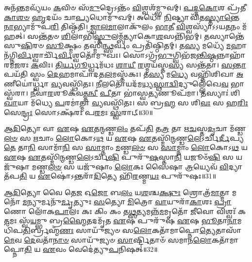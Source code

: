 𑌅𑌨᳴\-\ul{𑌨𑍍𑌤}\-𑌮𑌵𑍍𑌯᳴𑌯𑌂 \ul{𑌕}\-𑌵𑌿𑍞 𑌸᳴\-\ul{𑌮𑍁}\-𑌦𑍍𑌰𑍇𑌽𑌨𑍍𑌤𑌂᳴ \ul{𑌵𑌿}\-𑌶𑍍𑌵𑌶᳴𑌮𑍍𑌭𑍁𑌵𑌮𑍍। 
\-\ul{𑌪}\-\-\ul{𑌦𑍍𑌮}\-\-\ul{𑌕𑍋}\-𑌶 𑌪𑍍𑌰᳴𑌤𑍀\-\ul{𑌕𑌾}\-\-\ul{𑌶}\-\-\ul{𑍞} \ul{𑌹𑍃}\-𑌦𑌯𑌂᳴ 𑌚𑌾\-\ul{𑌪𑍍𑌯}\-𑌧𑍋𑌮𑍁᳴𑌖𑌮𑍍। 
𑌅𑌧𑍋᳴ \ul{𑌨𑌿}\-𑌷𑍍𑌟𑍍𑌯𑌾 𑌵𑌿᳴𑌤\-\ul{𑌸𑍍𑌤𑍍𑌯𑌾}\-\-\ul{𑌨𑍍𑌤𑍇} \ul{𑌨𑌾}\-𑌭𑍍𑌯𑌾𑌮𑍁᳴𑌪\-\ul{𑌰𑌿} 𑌤𑌿𑌷𑍍𑌠᳴𑌤𑌿। 
\-\ul{𑌜𑍍𑌵𑌾}\-\-\ul{𑌲}\-\-\ul{𑌮𑌾}\-𑌲𑌾𑌕𑍁᳴𑌲𑌂 \ul{𑌭𑌾}\-\-\ul{𑌤𑍀} \ul{𑌵𑌿}\-𑌶𑍍𑌵𑌸𑍍𑌯𑌾᳴𑌽𑌽𑌯\-\ul{𑌤}\-𑌨𑌂 𑌮᳴𑌹𑌤𑍍। 
𑌸𑌨𑍍𑌤᳴𑌤𑍞 \ul{𑌶𑌿}\-𑌲𑌾𑌭𑌿᳴\-\ul{𑌸𑍍𑌤𑍁}\-\-𑌲𑌮𑍍𑌬᳴𑌤𑍍𑌯𑌾𑌕𑍋\-\ul{𑌶}\-𑌸𑌨𑍍𑌨𑌿᳴𑌭𑌮𑍍। 
𑌤𑌸𑍍𑌯𑌾𑌨𑍍𑌤𑍇᳴ 𑌸𑍁\-\ul{𑌷𑌿}\-𑌰𑍞 \ul{𑌸𑍂}\-𑌕𑍍𑌷𑍍𑌮𑌂 𑌤𑌸𑍍𑌮𑌿॑\-\ul{𑌨𑍍𑌥𑍍𑌸}\-𑌰𑍍𑌵𑌂 𑌪𑍍𑌰𑌤𑌿᳴𑌷𑍍𑌠𑌿𑌤𑌮𑍍। 
𑌤\-\ul{𑌸𑍍𑌯} 𑌮𑌧𑍍𑌯𑍇᳴ \ul{𑌮}\-𑌹𑌾𑌨᳴\-𑌗𑍍𑌨𑌿\-\ul{𑌰𑍍𑌵𑌿}\-𑌶𑍍𑌵𑌾𑌰𑍍𑌚𑌿᳴\-\ul{𑌰𑍍𑌵𑌿}\-𑌶𑍍𑌵𑌤𑍋᳴𑌮𑍁𑌖𑌃। 
𑌸𑍋𑌽𑌗𑍍𑌰᳴\-\ul{𑌭𑍁}\-𑌗𑍍𑌵𑌿𑌭᳴𑌜\-\ul{𑌨𑍍𑌤𑌿}\-\-\ul{𑌷𑍍𑌠}\-𑌨𑍍𑌨𑌾𑌹𑌾᳴𑌰𑌮\-\ul{𑌜}\-𑌰𑌃 \ul{𑌕}\-𑌵𑌿𑌃। 
\-\ul{𑌤𑌿}\-\-\ul{𑌰𑍍𑌯}\-\-\ul{𑌗𑍂}\-𑌰𑍍𑌧𑍍𑌵𑌮᳴𑌧𑌃 \ul{𑌶𑌾}\-\-\ul{𑌯𑍀} \ul{𑌰}\-𑌶𑍍𑌮𑌯᳴𑌸𑍍𑌤\-\ul{𑌸𑍍𑌯} 𑌸𑌨𑍍𑌤᳴𑌤𑌾। 
\-\ul{𑌸}\-\-\ul{𑌨𑍍𑌤𑌾}\-𑌪𑌯᳴𑌤𑌿 𑌸𑍍𑌵𑌂 \ul{𑌦𑍇}\-𑌹𑌮𑌾\-𑌪𑌾᳴𑌦\-𑌤\-\ul{𑌲}\-\-𑌮𑌸𑍍𑌤᳴𑌕𑌃। 
𑌤\-\ul{𑌸𑍍𑌯} 𑌮\-\ul{𑌧𑍍𑌯𑍇} 𑌵𑌹𑍍𑌨𑌿᳴𑌶𑌿𑌖𑌾 \ul{𑌅}\-𑌣𑍀𑌯𑍋॑𑌰𑍍𑌧𑍍𑌵𑌾 \ul{𑌵𑍍𑌯}\-𑌵𑌸𑍍𑌥𑌿᳴𑌤𑌃। 
\-\ul{𑌨𑍀}\-𑌲𑌤𑍋᳴𑌯𑌦᳴\-𑌮\-\ul{𑌧𑍍𑌯}\-\-\ul{𑌸𑍍𑌥𑌾}\-\-\ul{𑌦𑍍𑌵𑌿}\-𑌦𑍍𑌯𑍁𑌲𑍍𑌲𑍇᳴𑌖𑍇\-\ul{𑌵} 𑌭𑌾𑌸𑍍𑌵᳴𑌰𑌾। 
\-\ul{𑌨𑍀}\-𑌵𑌾\-\ul{𑌰}\-𑌶𑍂𑌕᳴\-𑌵\-\ul{𑌤𑍍𑌤}\-\-\ul{𑌨𑍍𑌵𑍀} \ul{𑌪𑍀}\-𑌤𑌾 𑌭𑌾॑𑌸𑍍𑌵\-\ul{𑌤𑍍𑌯}\-𑌣𑍂𑌪᳴𑌮𑌾। 
𑌤𑌸𑍍𑌯𑌾𑌃॑ 𑌶𑌿\-\ul{𑌖𑌾}\-𑌯𑌾 𑌮᳴𑌧𑍍𑌯𑍇 \ul{𑌪}\-𑌰𑌮𑌾॑𑌤𑍍𑌮𑌾 \ul{𑌵𑍍𑌯}\-𑌵𑌸𑍍𑌥𑌿᳴𑌤𑌃। 
𑌸 𑌬𑍍𑌰\-\ul{𑌹𑍍𑌮} 𑌸 𑌶𑌿\-\ul{𑌵𑌃} 𑌸 𑌹\-\ul{𑌰𑌿𑌃} 𑌸𑍇\-\ul{𑌨𑍍𑌦𑍍𑌰𑌃} 𑌸𑍋𑌽𑌕𑍍𑌷᳴𑌰𑌃 𑌪\-\ul{𑌰}\-𑌮𑌃 \ul{𑌸𑍍𑌵}\-𑌰𑌾𑌟𑍍॥30॥
\anuvakamend[\-\ul{𑌨𑌾}\-\-\ul{𑌰𑌾}\-\-\ul{𑌯}\-𑌣𑌃 𑌸𑍍𑌥𑌿᳴𑌤𑍋 \ul{𑌵𑍍𑌯}\-𑌵𑌸𑍍𑌥𑌿᳴𑌤\-\ul{𑌶𑍍𑌚}\-𑌤𑍍𑌵𑌾𑌰𑌿᳴ 𑌚]

\-\ul{𑌆}\-\-\ul{𑌦𑌿}\-𑌤𑍍𑌯𑍋 𑌵𑌾 \ul{𑌏}\-𑌷 \ul{𑌏}\-𑌤\-\ul{𑌨𑍍𑌮}\-𑌣𑍍𑌡\-\ul{𑌲𑌂} 𑌤𑌪᳴\-\ul{𑌤𑌿} 𑌤\-\ul{𑌤𑍍𑌰} 𑌤𑌾 𑌋\-\ul{𑌚}\-𑌸𑍍𑌤\-\ul{𑌦𑍃}\-𑌚𑌾 𑌮᳴𑌣𑍍𑌡\-\ul{𑌲}\-\-\ul{𑍞} 𑌸 \ul{𑌋}\-𑌚𑌾𑌂 \ul{𑌲𑍋}\-𑌕𑍋𑌽\-\ul{𑌥} 𑌯 \ul{𑌏}\-𑌷 \ul{𑌏}\-𑌤𑌸𑍍𑌮𑌿᳴\-\ul{𑌨𑍍𑌮}\-𑌣𑍍𑌡\-\ul{𑌲𑍇}\-𑌽𑌰𑍍𑌚𑌿\-\ul{𑌰𑍍𑌦𑍀}\-𑌪𑍍𑌯\-\ul{𑌤𑍇} 𑌤𑌾\-\ul{𑌨𑌿} 𑌸𑌾𑌮𑌾᳴\-\ul{𑌨𑌿} 𑌸 \ul{𑌸𑌾}\-𑌮𑍍𑌨𑌾𑌂 \ul{𑌮}\-𑌣𑍍𑌡\-\ul{𑌲}\-\-\ul{𑍞} 𑌸 \ul{𑌸𑌾}\-𑌮𑍍𑌨𑌾𑌂 \ul{𑌲𑍋}\-𑌕𑍋𑌽\-\ul{𑌥} 𑌯 \ul{𑌏}\-𑌷 \ul{𑌏}\-𑌤𑌸𑍍𑌮𑌿᳴\-\ul{𑌨𑍍𑌮}\-𑌣𑍍𑌡\-\ul{𑌲𑍇}\-𑌽𑌰𑍍𑌚𑌿\-\ul{𑌷𑌿} 𑌪𑍁𑌰𑍁᳴\-\ul{𑌷}\-𑌸𑍍𑌤𑌾\-\ul{𑌨𑌿} 𑌯𑌜𑍂𑍞᳴\-\ul{𑌷𑌿} 𑌸 𑌯𑌜𑍁᳴𑌷𑌾 𑌮𑌣𑍍𑌡\-\ul{𑌲}\-\-\ul{𑍞} 𑌸 𑌯𑌜𑍁᳴𑌷𑌾𑌂 \ul{𑌲𑍋}\-𑌕𑌃 𑌸𑍈𑌷𑌾 \ul{𑌤𑍍𑌰}\-𑌯𑍍𑌯𑍇𑌵᳴ \ul{𑌵𑌿}\-𑌦𑍍𑌯𑌾 𑌤᳴𑌪\-\ul{𑌤𑌿} 𑌯 \ul{𑌏}\-𑌷𑍋॑𑌽𑌨𑍍𑌤𑌰𑌾᳴\-\ul{𑌦𑌿}\-𑌤𑍍𑌯𑍇 𑌹𑌿᳴\-\ul{𑌰}\-𑌣𑍍𑌮\-\ul{𑌯𑌃} 𑌪𑍁𑌰𑍁᳴𑌷𑌃॥31॥
\anuvakamend


\-\ul{𑌆}\-\-\ul{𑌦𑌿}\-𑌤𑍍𑌯𑍋 𑌵𑍈 𑌤𑍇\-\ul{𑌜} 𑌓\-\ul{𑌜𑍋} 𑌬\-\ul{𑌲𑌂} 𑌯\-\ul{𑌶}\-𑌶𑍍𑌚\-\ul{𑌕𑍍𑌷𑍁𑌃} 𑌶𑍍𑌰𑍋𑌤𑍍𑌰᳴\-\ul{𑌮𑌾}\-𑌤𑍍𑌮𑌾 𑌮𑌨𑍋᳴ \ul{𑌮}\-𑌨𑍍𑌯𑍁𑌰𑍍𑌮𑌨𑍁᳴\-\ul{𑌰𑍍𑌮𑍃}\-𑌤𑍍𑌯𑍁𑌃 \ul{𑌸}\-𑌤𑍍𑌯𑍋 \ul{𑌮𑌿}\-𑌤𑍍𑌰𑍋 \ul{𑌵𑌾}\-𑌯𑍁𑌰𑌾᳴\-\ul{𑌕𑌾}\-𑌶𑌃 \ul{𑌪𑍍𑌰𑌾}\-𑌣𑍋 𑌲𑍋᳴𑌕\-\ul{𑌪𑌾}\-𑌲𑌃 𑌕𑌃 𑌕𑌿𑌂 𑌕𑌂 𑌤\-\ul{𑌥𑍍𑌸}\-𑌤𑍍𑌯𑌮𑌨𑍍𑌨᳴\-\ul{𑌮}\-𑌮𑍃𑌤𑍋᳴ \ul{𑌜𑍀}\-𑌵𑍋 𑌵𑌿𑌶𑍍𑌵𑌃᳴ 𑌕\-\ul{𑌤}\-𑌮𑌃 𑌸𑍍𑌵᳴\-\ul{𑌯}\-𑌮𑍍𑌭𑍁 𑌬𑍍𑌰\-\ul{𑌹𑍍𑌮𑍈}\-𑌤𑌦𑌮𑍃᳴𑌤 \ul{𑌏}\-𑌷 𑌪𑍁𑌰𑍁᳴𑌷 \ul{𑌏}\-𑌷 \ul{𑌭𑍂}\-𑌤𑌾\-\ul{𑌨𑌾}\-𑌮𑌧𑌿᳴𑌪\-\ul{𑌤𑌿}\-𑌰𑍍𑌬𑍍𑌰𑌹𑍍𑌮᳴\-\ul{𑌣𑌃} 𑌸𑌾𑌯𑍁᳴𑌜𑍍𑌯𑍞 𑌸\-\ul{𑌲𑍋}\-𑌕𑌤𑌾᳴𑌮𑌾𑌪𑍍𑌨𑍋\-\ul{𑌤𑍍𑌯𑍇}\-𑌤𑌾𑌸𑌾᳴\-\ul{𑌮𑍇}\-𑌵 \ul{𑌦𑍇}\-𑌵𑌤𑌾᳴\-\ul{𑌨𑌾}\-\-\ul{𑍞} 𑌸𑌾𑌯𑍁᳴𑌜𑍍𑌯𑍞 \ul{𑌸𑌾}\-𑌰𑍍𑌷𑍍𑌟𑌿𑌤𑌾𑍞᳴ 𑌸𑌮𑌾𑌨\-\ul{𑌲𑍋}\-𑌕𑌤𑌾᳴𑌮𑌾𑌪𑍍𑌨𑍋\-\ul{𑌤𑌿} 𑌯 \ul{𑌏}\-𑌵𑌂 𑌵𑍇𑌦𑍇॑𑌤𑍍𑌯𑍁\-\ul{𑌪}\-𑌨𑌿𑌷𑌤𑍍॥32॥
\anuvakamend

